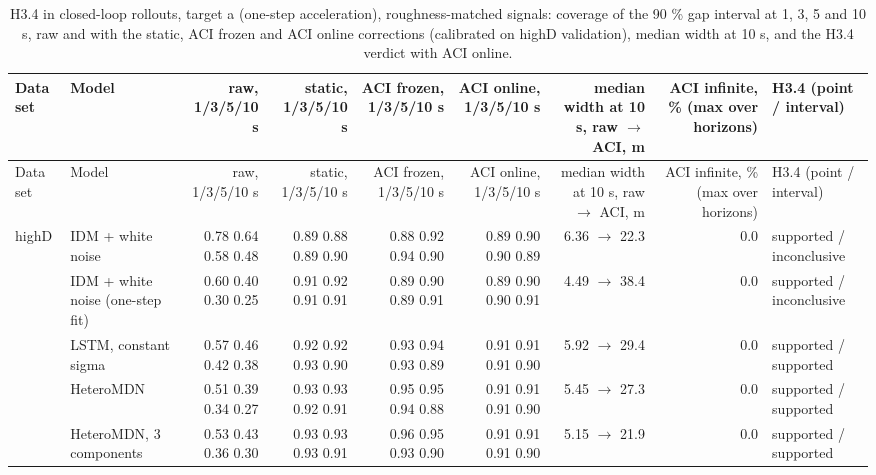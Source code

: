 \begingroup
\footnotesize
\begin{longtable}{llrrrrrrl}
\caption{H3.4 in closed-loop rollouts, target a (one-step acceleration), roughness-matched signals: coverage of the 90 \% gap interval at 1, 3, 5 and 10 s, raw and with the static, ACI frozen and ACI online corrections (calibrated on highD validation), median width at 10 s, and the H3.4 verdict with ACI online.}\label{tab:t4-coverage--matched--a} \\
\toprule
Data set & Model & raw, 1/3/5/10 s & static, 1/3/5/10 s & ACI frozen, 1/3/5/10 s & ACI online, 1/3/5/10 s & median width at 10 s, raw $\rightarrow$ ACI, m & ACI infinite, \% (max over horizons) & H3.4 (point / interval) \\
\midrule
\endfirsthead
\toprule
Data set & Model & raw, 1/3/5/10 s & static, 1/3/5/10 s & ACI frozen, 1/3/5/10 s & ACI online, 1/3/5/10 s & median width at 10 s, raw $\rightarrow$ ACI, m & ACI infinite, \% (max over horizons) & H3.4 (point / interval) \\
\midrule
\endhead
\bottomrule
\endlastfoot
highD & IDM + white noise & 0.78 0.64 0.58 0.48 & 0.89 0.88 0.89 0.90 & 0.88 0.92 0.94 0.90 & 0.89 0.90 0.90 0.89 & 6.36 $\rightarrow$ 22.3 & 0.0 & supported / inconclusive \\
 & IDM + white noise (one-step fit) & 0.60 0.40 0.30 0.25 & 0.91 0.92 0.91 0.91 & 0.89 0.90 0.89 0.91 & 0.89 0.90 0.90 0.91 & 4.49 $\rightarrow$ 38.4 & 0.0 & supported / inconclusive \\
 & LSTM, constant sigma & 0.57 0.46 0.42 0.38 & 0.92 0.92 0.93 0.90 & 0.93 0.94 0.93 0.89 & 0.91 0.91 0.91 0.90 & 5.92 $\rightarrow$ 29.4 & 0.0 & supported / supported \\
 & HeteroMDN & 0.51 0.39 0.34 0.27 & 0.93 0.93 0.92 0.91 & 0.95 0.95 0.94 0.88 & 0.91 0.91 0.91 0.90 & 5.45 $\rightarrow$ 27.3 & 0.0 & supported / supported \\
 & HeteroMDN, 3 components & 0.53 0.43 0.36 0.30 & 0.93 0.93 0.93 0.91 & 0.96 0.95 0.93 0.90 & 0.91 0.91 0.91 0.90 & 5.15 $\rightarrow$ 21.9 & 0.0 & supported / supported \\

\end{longtable}
